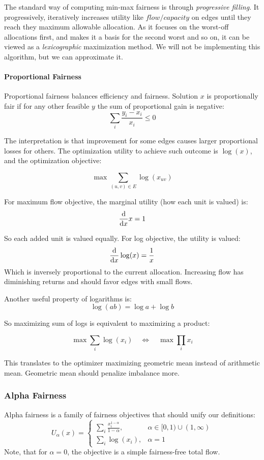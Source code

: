 \documentclass[12pt, openany]{article}
\begin{document}
The standard way of computing min-max fairness is through \textit{progressive filling}. It progressively, iteratively increases utility like \(flow / capacity\) on edges until they reach they maximum allowable allocation. As it focuses on the worst-off allocations first, and makes it a basis for the second worst and so on, it can be viewed as a \textit{lexicographic} maximization method. We will not be implementing this algorithm, but we can approximate it.

\paragraph{Proportional Fairness}

Proportional fairness balances efficiency and fairness. Solution $x$ is proportionally fair if for any other feasible $y$ the sum of proportional gain is negative:
\[
\sum_i \frac{y_i - x_i}{x_i} \le 0
\]

The interpretation is that improvement for some edges causes larger proportional losses for others. The optimization utility to achieve such outcome is $\log(x)$, and the optimization objective:

\[
\max \sum_{(u,v)\in E}\log(x_{uv})
\]

For maximum flow objective, the marginal utility (how each unit is valued) is:
\[
\dv{}{x} x = 1
\]

So each added unit is valued equally. For log objective, the utility is valued:
\[
\dv{}{x} \log(x)=\frac{1}{x}
\]
Which is inversely proportional to the current allocation. Increasing flow has diminishing returns and should favor edges with small flows.

Another useful property of logarithms is:
\[
\log(ab)=\log a + \log b
\]

So maximizing sum of logs is equivalent to maximizing a product:

\[
\max \sum_i \log(x_i)
\quad\Longleftrightarrow\quad
\max \prod_i x_i
\]

This translates to the optimizer maximizing geometric mean instead of arithmetic mean. Geometric mean should penalize imbalance more.

\subsubsection{Alpha Fairness}
Alpha fairness is a family of fairness objectives that should unify our definitions:
\[
U_\alpha(x)=
\begin{cases}
\displaystyle \sum_i \frac{x_i^{1-\alpha}}{1-\alpha},
& \alpha \in [0,1)\cup(1,\infty) \\[1 em]
\displaystyle \sum_i \log(x_i),
& \alpha = 1
\end{cases}
\]
Note, that for $\alpha = 0$, the objective is a simple fairness-free total flow.
\end{document}
